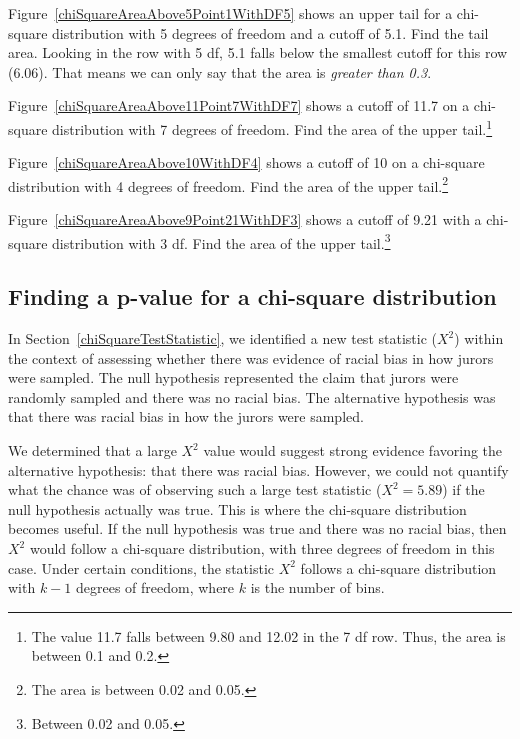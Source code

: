 \begin{example}{Figure~\ref{chiSquareAreaAbove5Point1WithDF5} shows an upper tail for a chi-square distribution with 5 degrees of freedom and a cutoff of 5.1. Find the tail area.}
Looking in the row with 5 df, 5.1 falls below the smallest cutoff for this row (6.06). That means we can only say that the area is \emph{greater than 0.3}.
\end{example}

\begin{exercise}
Figure~\ref{chiSquareAreaAbove11Point7WithDF7} shows a cutoff of 11.7 on a chi-square distribution with 7 degrees of freedom. Find the area of the upper tail.\footnote{The value 11.7 falls between 9.80 and 12.02 in the 7 df row. Thus, the area is between 0.1 and 0.2.}
\end{exercise}

\begin{exercise}
Figure~\ref{chiSquareAreaAbove10WithDF4} shows a cutoff of 10 on a chi-square distribution with 4 degrees of freedom. Find the area of the upper tail.\footnote{The area is between 0.02 and 0.05.}
\end{exercise}

\begin{exercise}
Figure~\ref{chiSquareAreaAbove9Point21WithDF3} shows a cutoff of 9.21 with a chi-square distribution with 3 df. Find the area of the upper tail.\footnote{Between 0.02 and 0.05.}
\end{exercise}


\subsection{Finding a p-value for a chi-square distribution}
\label{pValueForAChiSquareTest}

In Section~\ref{chiSquareTestStatistic}, we identified a new test statistic ($X^2$) within the context of assessing whether there was evidence of racial bias in how jurors were sampled. The null hypothesis represented the claim that jurors were randomly sampled and there was no racial bias. The alternative hypothesis was that there was racial bias in how the jurors were sampled.

We determined that a large $X^2$ value would suggest strong evidence favoring the alternative hypothesis: that there was racial bias. However, we could not quantify what the chance was of observing such a large test statistic ($X^2=5.89$) if the null hypothesis actually was true. This is where the chi-square distribution becomes useful. If the null hypothesis was true and there was no racial bias, then $X^2$ would follow a chi-square distribution, with three degrees of freedom in this case. Under certain conditions, the statistic $X^2$ follows a chi-square distribution with $k-1$ degrees of freedom, where $k$ is the number of bins.

